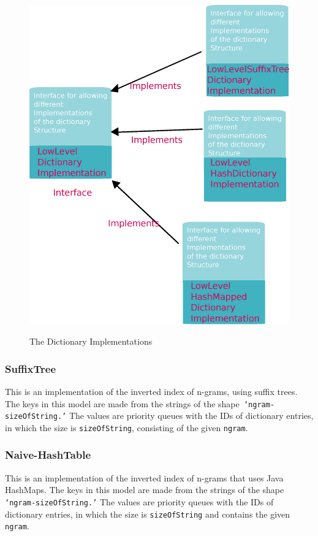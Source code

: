 \begin{figure}[h!]
  \caption{The Dictionary Implementations}
  \centering
    \includegraphics[scale=0.45]{graphics/dictionaryImplementations}
   \label{fig:dictionaryClasses}  
\end{figure}

\subsubsection{SuffixTree}  
This is an implementation of the inverted index of n-grams, using suffix trees. The keys in this model are made from the strings of the shape\texttt{ `ngram-sizeOfString.'} The values are priority queues with the IDs of dictionary entries, in which the size is \texttt{sizeOfString}, consisting of the given \texttt{ngram}.

\subsubsection{Naive-HashTable}
This is an implementation of the inverted index of n-grams that uses Java HashMaps. The keys in this model are made from the strings of the shape\texttt{ `ngram-sizeOfString.'} The values are priority queues with the IDs of dictionary entries, in which the size is \texttt{sizeOfString} and contains the given \texttt{ngram}.
  
